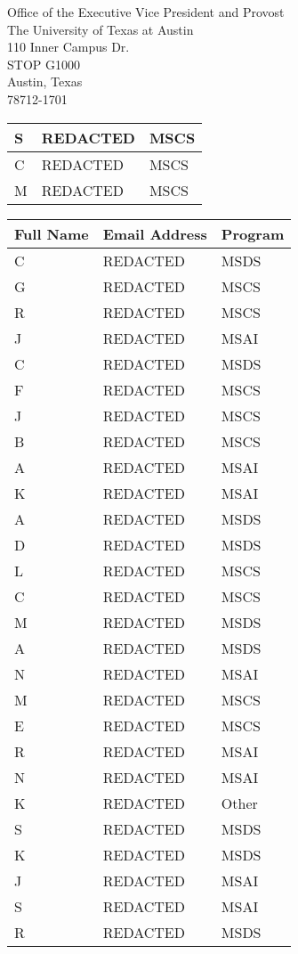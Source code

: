 \documentclass[11pt]{letter}
\begin{document}
\begin{letter}{Office of the Executive Vice President and Provost \\ The University of Texas at Austin \\ 110 Inner Campus Dr. \\ STOP G1000 \\ Austin, Texas \\ 78712-1701}
\begin{tabular}{|p{5cm}|p{6.7cm}|p{2.25cm}|}
        S & REDACTED & MSCS \\ \hline
        C & REDACTED & MSCS \\ \hline
        M & REDACTED & MSCS \\ \hline
    \end{tabular}
    \centering
    \begin{tabular}{|p{5cm}|p{6.7cm}|p{2.25cm}|}
        \hline
        \textbf{Full Name} & \textbf{Email Address} & \textbf{Program} \\ \hline
        C & REDACTED & MSDS \\ \hline
        G & REDACTED & MSCS \\ \hline
        R & REDACTED & MSCS \\ \hline
        J & REDACTED & MSAI \\ \hline
        C & REDACTED & MSDS \\ \hline
        F & REDACTED & MSCS \\ \hline
        J & REDACTED & MSCS \\ \hline
        B & REDACTED & MSCS \\ \hline
        A & REDACTED & MSAI \\ \hline
        K & REDACTED & MSAI \\ \hline
        A & REDACTED & MSDS \\ \hline
        D & REDACTED & MSDS \\ \hline
        L & REDACTED & MSCS \\ \hline
        C & REDACTED & MSCS \\ \hline
        M & REDACTED & MSDS \\ \hline
        A & REDACTED & MSDS \\ \hline
        N & REDACTED & MSAI \\ \hline
        M & REDACTED & MSCS \\ \hline
        E & REDACTED & MSCS \\ \hline
        R & REDACTED & MSAI \\ \hline
        N & REDACTED & MSAI \\ \hline
        K & REDACTED & Other \\ \hline
        S & REDACTED & MSDS \\ \hline
        K & REDACTED & MSDS \\ \hline
        J & REDACTED & MSAI \\ \hline
        S & REDACTED & MSAI \\ \hline
        R & REDACTED & MSDS \\ \hline

\end{tabular}
\end{letter}
\end{document}
